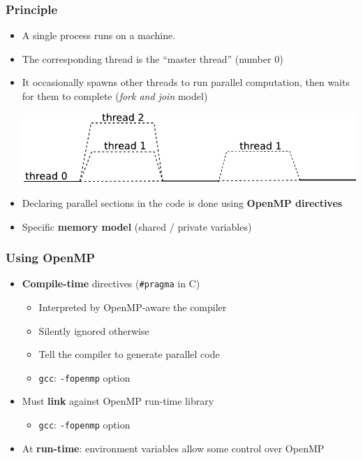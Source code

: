 \documentclass{beamer}
\begin{document}
\begin{frame}
  \frametitle{Principle}
\begin{itemize}
  
\item A single process runs on a machine.
\item The corresponding thread is the ``\alert{master} thread'' (number 0)
  
\item It occasionally spawns other threads to run parallel computation, then
  waits for them to complete  (\textit{fork and join} model)

  \smallskip
  \begin{center}
    \includegraphics[width=0.9\linewidth]{fork_and_join}
  \end{center}
  \bigskip
  
\item Declaring parallel sections in the code is done using \textbf{OpenMP directives}

\item Specific \textbf{memory model} (shared / private variables)
\end{itemize}
\end{frame}

\begin{frame}
  \frametitle{Using OpenMP}
  
\begin{itemize}
\item \textbf{Compile-time} directives ({\tt \#pragma} in C)
  \begin{itemize}
  \item Interpreted by OpenMP-aware the compiler
  \item \alert{Silently} ignored otherwise
  \item Tell the compiler to generate parallel code
  \item \texttt{gcc}: \texttt{-fopenmp} option
  \end{itemize}

\medskip
  
\item Must \textbf{link} against OpenMP run-time library
  \begin{itemize}
  \item \texttt{gcc}: \texttt{-fopenmp} option
  \end{itemize}

\medskip
  
\item At \textbf{run-time}: \alert{environment variables} allow some control over OpenMP
\end{itemize}
\end{frame}
\end{document}
